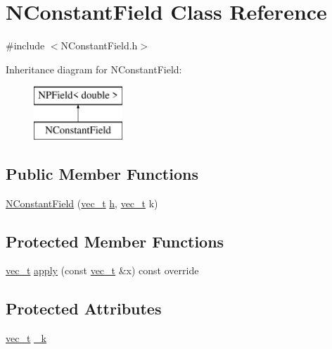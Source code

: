 \hypertarget{class_n_constant_field}{}\section{N\+Constant\+Field Class Reference}
\label{class_n_constant_field}


{\ttfamily \#include $<$N\+Constant\+Field.\+h$>$}

Inheritance diagram for N\+Constant\+Field\+:\begin{figure}[H]
\begin{center}
\leavevmode
\includegraphics[height=2.000000cm]{class_n_constant_field}
\end{center}
\end{figure}
\subsection*{Public Member Functions}
\begin{DoxyCompactItemize}
\item 
\mbox{\hyperlink{class_n_constant_field_a0bf33435d6fb4f605c1c85cf0d9ff770}{N\+Constant\+Field}} (\mbox{\hyperlink{_n_vector_8h_a0a2cfc67e738a3d73e4f12098c4c07f6}{vec\+\_\+t}} \mbox{\hyperlink{class_n_p_field_a21a56864db47d8589ec917764e3b2b85}{h}}, \mbox{\hyperlink{_n_vector_8h_a0a2cfc67e738a3d73e4f12098c4c07f6}{vec\+\_\+t}} k)
\end{DoxyCompactItemize}
\subsection*{Protected Member Functions}
\begin{DoxyCompactItemize}
\item 
\mbox{\hyperlink{_n_vector_8h_a0a2cfc67e738a3d73e4f12098c4c07f6}{vec\+\_\+t}} \mbox{\hyperlink{class_n_constant_field_a2b81a6a4f9fa56580002d180ac769c9b}{apply}} (const \mbox{\hyperlink{_n_vector_8h_a0a2cfc67e738a3d73e4f12098c4c07f6}{vec\+\_\+t}} \&x) const override
\end{DoxyCompactItemize}
\subsection*{Protected Attributes}
\begin{DoxyCompactItemize}
\item 
\mbox{\hyperlink{_n_vector_8h_a0a2cfc67e738a3d73e4f12098c4c07f6}{vec\+\_\+t}} \mbox{\hyperlink{class_n_constant_field_adc7caf84cc8e117807c19c95cb47d1bc}{\+\_\+k}}
\end{DoxyCompactItemize}
